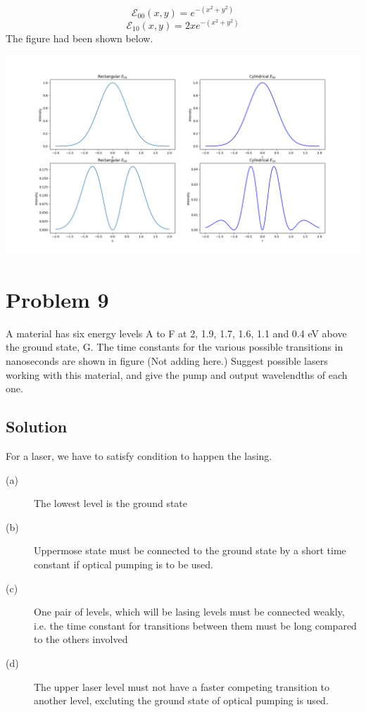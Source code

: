 \documentclass[a4paper,11pt]{article}
\begin{document}
$$\mathcal{E}_{00}(x,y) = e^{-(x^2+y^2)}$$
$$\mathcal{E}_{10}(x,y) = 2x e^{-(x^2+y^2)}$$
The figure had been shown below.

\begin{center}
\includegraphics[width=.9\linewidth]{laser_intensity.png}
\end{center}

\newpage
\section*{Problem 9}
\label{sec:orgd8c1546}
A material has six energy levels A to F at 2, 1.9, 1.7, 1.6, 1.1 and 0.4 eV above the ground state, G. The time constants for the various possible transitions in nanoseconds are shown in figure (Not adding here.) Suggest possible lasers working with this material, and give the pump and output wavelendths of each one.
\subsection*{Solution}
\label{sec:org35f67cb}

For a laser, we have to satisfy condition to happen the lasing.
\begin{description}
\item[{(a)}] The lowest level is the ground state
\item[{(b)}] Uppermose state must be connected to the ground state by a short time constant if optical pumping is to be used.
\item[{(c)}] One pair of levels, which will be lasing levels must be connected weakly, i.e. the time constant for transitions between them must be long compared to the others involved
\item[{(d)}] The upper laser level must not have a faster competing transition to another level, excluting the ground state of optical pumping is used.
\end{description}
\end{document}
